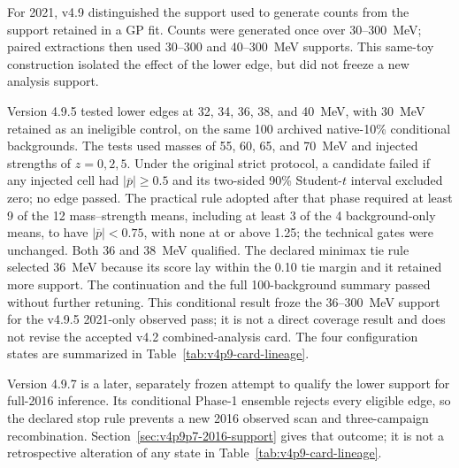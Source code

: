 For 2021, v4.9 distinguished the support used to generate counts from the support
retained in a GP fit. Counts were generated once over 30--300~MeV; paired extractions
then used 30--300 and 40--300~MeV supports. This same-toy construction isolated the
effect of the lower edge, but did not freeze a new analysis support.

Version 4.9.5 tested lower edges at 32, 34, 36, 38, and 40~MeV, with 30~MeV retained
as an ineligible control, on the same 100 archived native-10\% conditional backgrounds.
The tests used masses of 55, 60, 65, and 70~MeV and injected strengths of
$z=0,2,5$. Under the original strict protocol, a candidate failed if any injected cell
had $|\overline{p}|\geq0.5$ and its two-sided 90\% Student-$t$ interval excluded zero;
no edge passed. The practical rule adopted after that phase required at least 9 of the
12 mass--strength means, including at least 3 of the 4 background-only means, to have
$|\overline{p}|<0.75$, with none at or above 1.25; the technical gates were unchanged.
Both 36 and 38~MeV qualified. The declared minimax tie rule selected 36~MeV because
its score lay within the 0.10 tie margin and it retained more support. The continuation
and the full 100-background summary passed without further retuning. This conditional
result froze the 36--300~MeV support for the v4.9.5 2021-only observed pass; it is not
a direct coverage result and does not revise the accepted v4.2 combined-analysis card.
The four configuration states are summarized in
Table~\ref{tab:v4p9-card-lineage}.

Version 4.9.7 is a later, separately frozen attempt to qualify the lower support for
full-2016 inference.  Its conditional Phase-1 ensemble rejects every eligible edge, so
the declared stop rule prevents a new 2016 observed scan and three-campaign
recombination.  Section~\ref{sec:v4p9p7-2016-support} gives that outcome; it is not a
retrospective alteration of any state in Table~\ref{tab:v4p9-card-lineage}.

